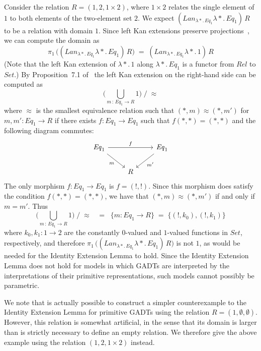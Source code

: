\documentclass[acmsmall,screen,review,anonymous]{acmart}
\theoremstyle{definition}
\begin{document}
\begin{example}
Consider the relation $R = (1, 2, 1 \times 2)$, where $1 \times 2$
relates the single element of $1$ to both elements of the two-element
set $2$. We expect $(\mathit{Lan}_{\lambda *\!.\,\mathit{Eq}_1}
\lambda *\!.\,\mathit{Eq}_1)\, R$ to be a relation with domain
$1$. Since left Kan extensions preserve projections~\cite{rie16}, we
can compute the domain as
\[\pi_1\,\big( (\mathit{Lan}_{\lambda *\!.\,\mathit{Eq}_1} \lambda
*\!.\,\mathit{Eq}_1) \, R \big)\;=\; (\mathit{Lan}_{\lambda
 *\!.\,\mathit{Eq}_1} \lambda *\!. \,1)\, R\] (Note that the left Kan
 extension of $\lambda *\!. \,1$ along $\lambda *\!.\,\mathit{Eq}_1$
 is a functor from $\mathit{Rel}$ to $\mathit{Set}$.) By
 Proposition~7.1 of~\cite{blw03} the left Kan extension on the
 right-hand side can be computed as
\[ \big( \bigcup_{m\, :\, \mathit{Eq}_1 \to R} 1 \big) \; /\; \approx\]
where $\approx$ is the smallest equivalence relation such that $(\ast,
m) \approx (\ast, m')$ for $m, m' : \mathit{Eq}_1 \to R$ if there
exists $f : \mathit{Eq}_1 \to \mathit{Eq}_1$ such that $f (\ast, \ast)
= (\ast, \ast)$ and the following diagram commutes:
\[
\begin{tikzcd}
\mathit{Eq}_1 \ar[rr, "{f}"] \ar[dr, "m"']
&&\mathit{Eq}_1 \ar[dl, "m'"] \\
&R
\end{tikzcd}
\]
The only morphism $f : \mathit{Eq}_1 \to \mathit{Eq}_1$ is $f = (!,
!)$. Since this morphism does satisfy the condition $f (\ast, \ast) =
(\ast, \ast)$, we have that $(\ast, m) \approx (\ast, m')$ if and only
if $m = m'$. Thus
\[ \big( \bigcup_{m\, :\,
  \mathit{Eq}_1 \to R} 1 \big) \; /\; \approx \;\;\; = \;\; \{m :
\mathit{Eq}_1 \to R\} \;=\; \{(!, k_0), (!, k_1)\}\] where $k_0, k_1 :
1 \to 2$ are the constantly $0$-valued and $1$-valued functions in
$\mathit{Set}$, respectively, and therefore $\pi_1\,\big(
(\mathit{Lan}_{\lambda *\!.\,\mathit{Eq}_1} \lambda
*\!.\,\mathit{Eq}_1) \, R \big)$ is not $1$, as would be needed for
the Identity Extension Lemma to hold.  Since the Identity Extension
Lemma does not hold for models in which GADTs are interpreted by the
interpretations of their primitive representations, such models cannot
possibly be parametric.
\end{example}

We note that is actually possible to construct a simpler
counterexample to the Identity Extension Lemma for primitive GADTs
using the relation $R = (1,\emptyset, \emptyset)$. However, this
relation is somewhat artificial, in the sense that its domain is
larger than is strictly necessary to define an empty relation. We
therefore give the above example using the relation $(1,2,1 \times 2)$
instead.
\end{document}

